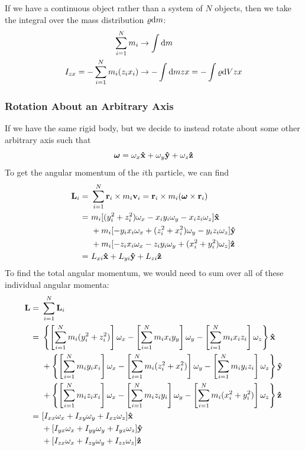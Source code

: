 \documentclass[a4paper]{article}
\begin{document}
If we have a continuous object rather than a system of $N$ objects, then we
take the integral over the mass distribution $\varrho\mathrm{d} m$:
\begin{align*}
	\sum_{i=1}^{N} m_i &\to \int\mathrm{d} m\\
	I_{zx} = -\sum_{i=1}^{N}m_i(z_ix_i) &\to
	-\int\mathrm{d} mzx = -\int\varrho\mathrm{d} Vzx
\end{align*}

\subsubsection{Rotation About an Arbitrary Axis}
If we have the same rigid body, but we decide to instead rotate about some
other arbitrary axis such that
\[ \boldsymbol{\mathbf{\omega}} = \omega_x\boldsymbol{\mathbf{\hat{x}}}+\omega_y\boldsymbol{\mathbf{\hat{y}}}+\omega_z\boldsymbol{\mathbf{\hat{z}}} \]
To get the angular momentum of the $i$th particle, we can find
\begin{align*}
	\boldsymbol{\mathbf{L}}_i =\ &\sum_{i=1}^{N} \boldsymbol{\mathbf{r}}_i\times m_i\boldsymbol{\mathbf{v}}_i
		= \boldsymbol{\mathbf{r}}_i\times m_i(\boldsymbol{\mathbf{\omega}}\times\boldsymbol{\mathbf{r}}_i)\\
	=\ &m_i[(y_i^2+z_i^2)\omega_x-x_iy_i\omega_y-x_iz_i\omega_z]\boldsymbol{\mathbf{\hat{x}}}\\
	&+ m_i[-y_ix_i\omega_x + (z_i^2+x_i^2)\omega_y - y_iz_i\omega_z]\boldsymbol{\mathbf{\hat{y}}}\\
	&+ m_i[-z_ix_i\omega_x - z_iy_i\omega_y + (x_i^2+y_i^2)\omega_z]\boldsymbol{\mathbf{\hat{z}}}\\
	=\ &L_{xi}\boldsymbol{\mathbf{\hat{x}}} + L_{yi}\boldsymbol{\mathbf{\hat{y}}} + L_{zi}\boldsymbol{\mathbf{\hat{z}}}
\end{align*}
To find the total angular momentum, we would need to sum over all of these
individual angular momenta:
\begin{align*}
	\boldsymbol{\mathbf{L}}=\ &\sum_{i=1}^{N}\boldsymbol{\mathbf{L}}_i\\
	=\ &\left\{\left[\sum_{i=1}^{N}m_i(y_i^2+z_i^2)\right]\omega_x
		-\left[\sum_{i=1}^{N}m_ix_iy_y\right]\omega_y
		-\left[\sum_{i=1}^{N}m_ix_iz_i\right]\omega_z\right\}\boldsymbol{\mathbf{\hat{x}}}\\
	&+ \left\{\left[\sum_{i=1}^{N}m_iy_ix_i\right]\omega_x
		-\left[\sum_{i=1}^{N}m_i(z_i^2+x_i^2)\right]\omega_y
		-\left[\sum_{i=1}^{N}m_iy_iz_i\right]\omega_z\right\}\boldsymbol{\mathbf{\hat{y}}}\\ 
	&+ \left\{\left[\sum_{i=1}^{N}m_iz_ix_i\right]\omega_x
		-\left[\sum_{i=1}^{N}m_iz_iy_i\right]\omega_y
		-\left[\sum_{i=1}^{N}m_i(x_i^2+y_i^2)\right]\omega_z\right\}\boldsymbol{\mathbf{\hat{z}}}\\
	=\ &[I_{xx}\omega_x+I_{xy}\omega_y+I_{xz}\omega_z]\boldsymbol{\mathbf{\hat{x}}}\\
	   &+[I_{yx}\omega_x+I_{yy}\omega_y+I_{yz}\omega_z]\boldsymbol{\mathbf{\hat{y}}}\\
	   &+[I_{zx}\omega_x+I_{zy}\omega_y+I_{zz}\omega_z]\boldsymbol{\mathbf{\hat{z}}}
\end{align*}
\end{document}
